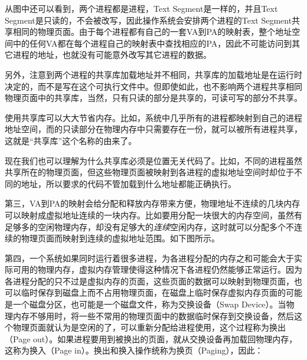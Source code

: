 

从图中还可以看到，两个进程都是进程，Text Segment是一样的，并且Text Segment是只读的，不会被改写，因此操作系统会安排两个进程的Text Segment共享相同的物理页面。由于每个进程都有自己的一套VA到PA的映射表，整个地址空间中的任何VA都在每个进程自己的映射表中查找相应的PA，因此不可能访问到其它进程的地址，也就没有可能意外改写其它进程的数据。



另外，注意到两个进程的共享库加载地址并不相同，共享库的加载地址是在运行时决定的，而不是写在这个可执行文件中。但即使如此，也不影响两个进程共享相同物理页面中的共享库，当然，只有只读的部分是共享的，可读可写的部分不共享。



使用共享库可以大大节省内存。比如，系统中几乎所有的进程都映射到自己的进程地址空间，而的只读部分在物理内存中只需要存在一份，就可以被所有进程共享，这就是“共享库”这个名称的由来了。



现在我们也可以理解为什么共享库必须是位置无关代码了。比如，不同的进程虽然共享所在的物理页面，但这些物理页面被映射到各进程的虚拟地址空间时却位于不同的地址，所以要求的代码不管加载到什么地址都能正确执行。



第三，VA到PA的映射会给分配和释放内存带来方便，物理地址不连续的几块内存可以映射成虚拟地址连续的一块内存。比如要用分配一块很大的内存空间，虽然有足够多的空闲物理内存，却没有足够大的\emph{连续}空闲内存，这时就可以分配多个不连续的物理页面而映射到连续的虚拟地址范围。如下图所示。




第四，一个系统如果同时运行着很多进程，为各进程分配的内存之和可能会大于实际可用的物理内存，虚拟内存管理使得这种情况下各进程仍然能够正常运行。因为各进程分配的只不过是虚拟内存的页面，这些页面的数据可以映射到物理页面，也可以临时保存到磁盘上而不占用物理页面，在磁盘上临时保存虚拟内存页面的可能是一个磁盘分区，也可能是一个磁盘文件，称为交换设备（Swap Device）。当物理内存不够用时，将一些不常用的物理页面中的数据临时保存到交换设备，然后这个物理页面就认为是空闲的了，可以重新分配给进程使用，这个过程称为换出（Page out）。如果进程要用到被换出的页面，就从交换设备再加载回物理内存，这称为换入（Page in）。换出和换入操作统称为换页（Paging），因此：


